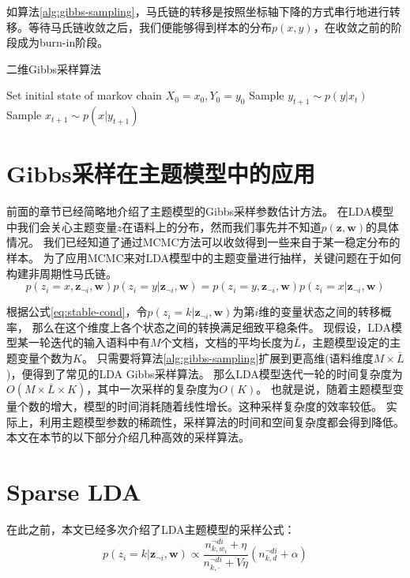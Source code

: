 如算法\ref{alg:gibbs-sampling}，马氏链的转移是按照坐标轴下降的方式串行地进行转移。等待马氏链收敛之后，我们便能够得到样本的分布$p(x,y)$，在收敛之前的阶段成为burn-in阶段。

\begin{algorithm}[htb]  
\caption{二维Gibbs采样算法}
\label{alg:gibbs-sampling}
\begin{algorithmic}[1] 
\State Set initial state of markov chain $X_0 = x_0, Y_0 = y_0$
\State Sample $y_{t+1} \sim p(y | x_t)$
\State Sample $x_{t+1} \sim p(x | y_{t+1})$
\EndFor
\end{algorithmic}  
\end{algorithm}  

\section{Gibbs采样在主题模型中的应用}
前面的章节已经简略地介绍了主题模型的Gibbs采样参数估计方法。
在LDA模型中我们会关心主题变量$z$在语料上的分布，然而我们事先并不知道$p\mathbf{ (z, w)}$的具体情况。
我们已经知道了通过MCMC方法可以收敛得到一些来自于某一稳定分布的样本。
为了应用MCMC来对LDA模型中的主题变量进行抽样，关键问题在于如何构建非周期性马氏链。
\begin{equation}
\label{eq:stable-cond}
p(z_i = x , \mathbf{z}_{\neg i}, \mathbf{w}) p( z_i = y | \mathbf{z}_{\neg i},  \mathbf{w})  =  
p(z_i = y , \mathbf{z}_{\neg i}, \mathbf{w}) p( z_i = x | \mathbf{z}_{\neg i},  \mathbf{w}) 
\end{equation}

根据公式\ref{eq:stable-cond}，令$p( z_i = k | \mathbf{z}_{\neg i},  \mathbf{w})$为第$i$维的变量状态之间的转移概率，
那么在这个维度上各个状态之间的转换满足细致平稳条件。
现假设，LDA模型某一轮迭代的输入语料中有$M$个文档，文档的平均长度为$\bar{L}$，主题模型设定的主题变量个数为$K$。
只需要将算法\ref{alg:gibbs-sampling}扩展到更高维(语料维度$M \times \bar{L}$)，便得到了常见的LDA Gibbs采样算法。
那么LDA模型迭代一轮的时间复杂度为$O(M\times \bar{L} \times K)$，其中一次采样的复杂度为$O(K)$。
也就是说，随着主题模型变量个数的增大，模型的时间消耗随着线性增长。这种采样复杂度的效率较低。
实际上，利用主题模型参数的稀疏性，采样算法的时间和空间复杂度都会得到降低。
本文在本节的以下部分介绍几种高效的采样算法。

\section{Sparse LDA}
在此之前，本文已经多次介绍了LDA主题模型的采样公式：
\begin{equation}
\label{eq:sample-prob}
p( z_i = k | \mathbf{z}_{\neg i},  \mathbf{w}) 
	\propto  \dfrac{ n_{k, w_i}^{\neg di} + \eta }{ n_{k, \cdot}^{\neg di} + V\eta}(n_{k,d}^{\neg di} + \alpha)
\end{equation}

